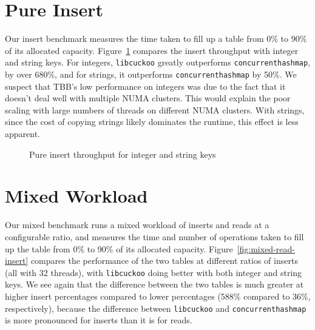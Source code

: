 \documentclass{article}
\newcommand{\tbbmap}{\texttt{concurrent\textunderscore hash\textunderscore map}}
\newcommand{\libcuckoo}{\texttt{libcuckoo}}
\begin{document}
\section*{Pure Insert}
Our insert benchmark measures the time taken to fill up a table from 0\% to 90\%
of its allocated capacity. Figure~\ref{fig:pure-insert} compares the insert
throughput with integer and string keys. For integers, {\libcuckoo} greatly
outperforms {\tbbmap}, by over 680\%, and for strings, it outperforms {\tbbmap}
by 50\%. We suspect that TBB's low performance on integers was due to the fact
that it doesn't deal well with multiple NUMA clusters. This would explain the
poor scaling with large numbers of threads on different NUMA clusters. With
strings, since the cost of copying strings likely dominates the runtime, this
effect is less apparent.

\begin{figure}[!htbp]
  \centering
  \caption{Pure insert throughput for integer and string keys}
  \label{fig:pure-insert}
\end{figure}

\section*{Mixed Workload}
Our mixed benchmark runs a mixed workload of inserts and reads at a configurable
ratio, and measures the time and number of operations taken to fill up the table
from 0\% to 90\% of its allocated capacity. Figure~\ref{fig:mixed-read-insert}
compares the performance of the two tables at different ratios of inserts (all
with 32 threads), with {\libcuckoo} doing better with both integer and string
keys. We see again that the difference between the two tables is much greater at
higher insert percentages compared to lower percentages (588\% compared to 36\%,
respectively), because the difference between {\libcuckoo} and {\tbbmap} is more
pronounced for inserts than it is for reads.
\end{document}
